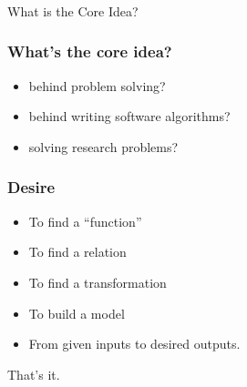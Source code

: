 
\begin{frame}[fragile]\frametitle{}
\begin{center}
{\Large What is the Core Idea?}
\end{center}
\end{frame}

\begin{frame}[fragile]\frametitle{What's the core idea?}
\begin{itemize}
\item behind problem solving?
\item behind writing software algorithms?
\item solving research problems?
\end{itemize}
\end{frame}

\begin{frame}[fragile]\frametitle{Desire}
\begin{itemize}
\item To find a ``function''
\item To find a relation
\item To find a transformation
\item To build a model
\item From given inputs to desired outputs.
\end{itemize}
That's it.
\end{frame}

